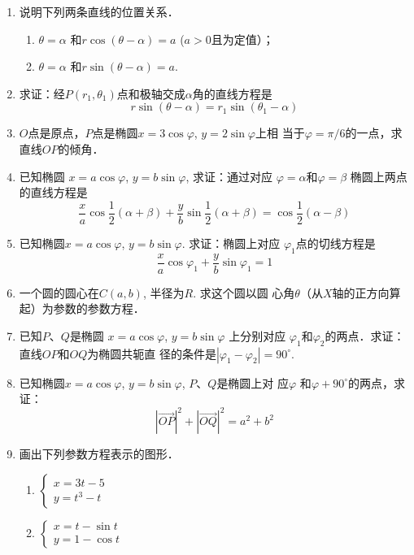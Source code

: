 \begin{enumerate}
\item 说明下列两条直线的位置关系．
\begin{enumerate}
    \item $\theta =\alpha$ 和$r \cos(\theta-\alpha)=a$ ($a>0$且为定值）；
\item $\theta =\alpha$ 和$r\sin(\theta -\alpha)=a$.
\end{enumerate}

\item 求证：经$P(r_1,\theta_1)$点和极轴交成$\alpha$角的直线方程是
\[r\sin(\theta -\alpha )=r_1\sin(\theta_1-\alpha)\]
\item $O$点是原点，$P$点是椭圆$x=3\cos\varphi$, $y=2\sin\varphi$上相
当于$\varphi=\pi/6$的一点，求直线$OP$的倾角．
\item 已知椭圆
$x=a\cos\varphi$, $y=b\sin\varphi$, 求证：通过对应
$\varphi =\alpha$和$\varphi =\beta$ 椭圆上两点的直线方程是
\[\frac{x}{a}\cos\frac{1}{2}(\alpha+\beta )+\frac{y}{b}\sin\frac{1}{2}(\alpha+\beta )=\cos\frac{1}{2}(\alpha-\beta )\]
\item 已知椭圆$x=a\cos\varphi$, $y=b\sin\varphi$. 求证：椭圆上对应
$\varphi_1$点的切线方程是
\[\frac{x}{a}\cos\varphi_1+\frac{y}{b}\sin\varphi_1=1\]
\item 一个圆的圆心在$C(a,b)$, 半径为$R$. 求这个圆以圆
心角$\theta$（从$X$轴的正方向算起）为参数的参数方程．
\item 已知$P$、$Q$是椭圆
$x=a\cos\varphi$, $y=b\sin\varphi$ 上分别对应
$\varphi_1$和$\varphi_2$的两点．求证：直线$OP$和$OQ$为椭圆共轭直
径的条件是$|\varphi_1-\varphi_2|=90^{\circ}$.
\item 已知椭圆$x=a\cos\varphi$, $y=b\sin\varphi$, $P$、$Q$是椭圆上对
应$\varphi$ 和$\varphi +90^{\circ}$的两点，求证：
\[|\Vec{OP}|^2+|\Vec{OQ}|^2=a^2+b^2\]

\item 画出下列参数方程表示的图形．
\begin{multicols}{2}
\begin{enumerate}
    \item $\begin{cases}
        x=3t-5\\y=t^3-t
    \end{cases}$
    \item $\begin{cases}
        x=t-\sin t\\ y=1-\cos t
    \end{cases}$
\end{enumerate}
\end{multicols}
\end{enumerate}



